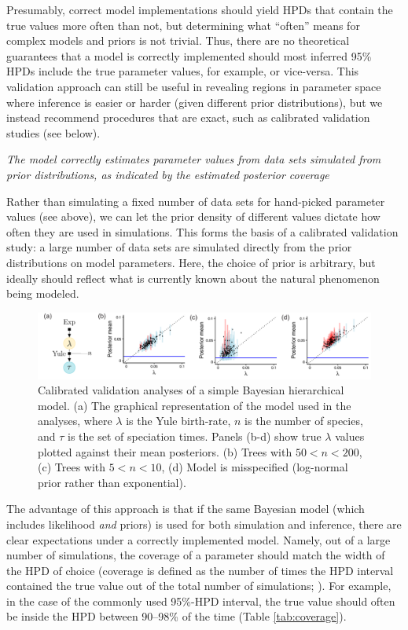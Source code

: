 \documentclass[oneside]{article}
\begin{document}
Presumably, correct model implementations should yield HPDs that contain
the true values more often than not, but determining what ``often'' means
for complex models and priors is not trivial.
Thus, there are no theoretical guarantees that a model is correctly
implemented should most inferred 95\% HPDs include the true parameter
values, for example, or vice-versa.
This validation approach can still be useful in revealing regions
in parameter space where inference is easier or harder (given different
prior distributions), but we instead recommend procedures that are exact,
such as calibrated validation studies (see below).

\vspace{.5cm}
\noindent \emph{The model correctly estimates parameter values from
  data sets simulated from prior distributions, as indicated by the
  estimated posterior coverage}

Rather than simulating a fixed number of data sets for hand-picked
parameter values (see above), we can let the prior density of
different values dictate how often they are used in simulations.
This forms the basis of a calibrated validation study: a large number
of data sets are simulated directly from the prior distributions on
model parameters.
Here, the choice of prior is arbitrary, but ideally should reflect
what is currently known about the natural phenomenon being modeled.

\begin{figure}
  \includegraphics[width=\textwidth]{../figures/yule_calval.pdf}
  \caption{Calibrated validation analyses of a simple Bayesian
    hierarchical model. (a) The graphical representation of the model used in
    the analyses, where $\lambda$ is the Yule birth-rate, $n$ is the
    number of species, and $\tau$ is the set of speciation times. Panels (b-d)
    show true $\lambda$ values plotted against their mean posteriors. (b) Trees
    with $50<n<200$, (c) Trees with $5<n<10$, (d) Model is
    misspecified (log-normal prior rather than exponential).
  }
  \label{fig:yulecalval}
\end{figure}

The advantage of this approach is that if the same Bayesian model (which
includes likelihood \emph{and} priors) is used for both
simulation and inference, there are clear expectations under a
correctly implemented model.
Namely, out of a large number of simulations, the coverage of a
parameter should match the width of the HPD of choice
(coverage is defined as the number of times the HPD
interval contained the true value out of the total number of
simulations; \citealp{dawid82}).
For example, in the case of the commonly used 95\%-HPD interval, the true value
should often be inside the HPD between 90--98\% of the time (Table
\ref{tab:coverage}).
\end{document}
